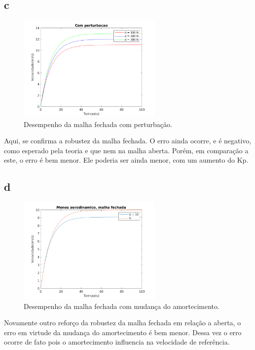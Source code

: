 \documentclass{article}[twocolumn]
\begin{document}
	\subsection{c}
	\begin{figure}[H]
		\centering
		\includegraphics[width=7cm]{3c.png}
		\caption{Desempenho da malha fechada com perturba\c{c}\~ao.}
	\end{figure}
	Aqui, se confirma a robustez da malha fechada. O erro ainda ocorre, e \'e negativo, como
	esperado pela teoria e que nem na malha aberta. Por\'em, em compara\c{c}\~ao a este, o erro
	\'e bem menor. Ele poderia ser ainda menor, com um aumento do Kp.
	\subsection{d}
	\begin{figure}[H]
		\centering
		\includegraphics[width=7cm]{3d.png}
		\caption{Desempenho da malha fechada com mudan\c{c}a do amortecimento.}
	\end{figure}
	Novamente outro refor\c{c}o da robustez da malha fechada em rela\c{c}\~ao a aberta,
	o erro em virtude da mudan\c{c}a do amortecimento \'e bem menor. Dessa vez o erro
	ocorre de fato pois o amortecimento influencia na velocidade de refer\^encia.
\end{document}
